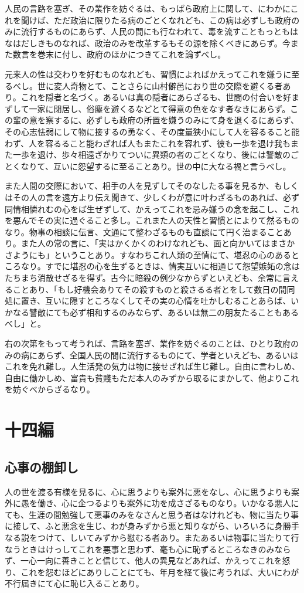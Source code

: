 \documentclass[a4paper, platex, dvipdfmx]{jsarticle}
\begin{document}
人民の言路を塞ぎ、その業作を妨ぐるは、もっぱら政府上に関して、にわかにこれを聞けば、ただ政治に限りたる病のごとくなれども、この病は必ずしも政府のみに流行するものにあらず、人民の間にも行なわれて、毒を流すこともっともはなはだしきものなれば、政治のみを改革するもその源を除くべきにあらず。今また数言を巻末に付し、政府のほかにつきてこれを論ずべし。

元来人の性は交わりを好むものなれども、習慣によればかえってこれを嫌うに至るべし。世に変人奇物とて、ことさらに山村僻邑におり世の交際を避くる者あり。これを隠者と名づく。あるいは真の隠者にあらざるも、世間の付合いを好まずして一家に閉居し、俗塵を避くるなどとて得意の色をなす者なきにあらず。この輩の意を察するに、必ずしも政府の所置を嫌うのみにて身を退くるにあらず、その心志怯弱にして物に接するの勇なく、その度量狭小にして人を容るること能わず、人を容るること能わざれば人もまたこれを容れず、彼も一歩を退け我もまた一歩を退け、歩々相遠ざかりてついに異類の者のごとくなり、後には讐敵のごとくなりて、互いに怨望するに至ることあり。世の中に大なる禍と言うべし。

また人間の交際において、相手の人を見ずしてそのなしたる事を見るか、もしくはその人の言を遠方より伝え聞きて、少しくわが意に叶わざるものあれば、必ず同情相憐れむの心をば生ぜずして、かえってこれを忌み嫌うの念を起こし、これを悪んでその実に過ぐること多し。これまた人の天性と習慣とによりて然るものなり。物事の相談に伝言、文通にて整わざるものも直談にて円く治まることあり。また人の常の言に、「実はかくかくのわけなれども、面と向かいてはまさかさようにも」ということあり。すなわちこれ人類の至情にて、堪忍の心のあるところなり。すでに堪忍の心を生ずるときは、情実互いに相通じて怨望嫉妬の念はたちまち消散せざるを得ず。古今に暗殺の例少なからずといえども、余常に言えることあり、「もし好機会ありてその殺すものと殺さるる者とをして数日の間同処に置き、互いに隠すところなくしてその実の心情を吐かしむることあらば、いかなる讐敵にても必ず相和するのみならず、あるいは無二の朋友たることもあるべし」と。

右の次第をもって考うれば、言路を塞ぎ、業作を妨ぐるのことは、ひとり政府のみの病にあらず、全国人民の間に流行するものにて、学者といえども、あるいはこれを免れ難し。人生活発の気力は物に接せざれば生じ難し。自由に言わしめ、自由に働かしめ、富貴も貧賤もただ本人のみずから取るにまかして、他よりこれを妨ぐべからざるなり。

\section{十四編}
\subsection{心事の棚卸し}
人の世を渡る有様を見るに、心に思うよりも案外に悪をなし、心に思うよりも案外に愚を働き、心に企つるよりも案外に功を成さざるものなり。いかなる悪人にても、生涯の間勉強して悪事のみをなさんと思う者はなけれども、物に当たり事に接して、ふと悪念を生じ、わが身みずから悪と知りながら、いろいろに身勝手なる説をつけて、しいてみずから慰むる者あり。またあるいは物事に当たりて行なうときはけっしてこれを悪事と思わず、毫も心に恥ずるところなきのみならず、一心一向に善きことと信じて、他人の異見などあれば、かえってこれを怒り、これを怨むほどにありしことにても、年月を経て後に考うれば、大いにわが不行届きにて心に恥じ入ることあり。
\end{document}
